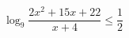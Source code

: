 \begin{ex}
	\begin{condition}
	\( \log_9\dfrac{2x^2+15x+22}{x+4}\leq\dfrac{1}{2} \)
	\end{condition}
	\answer{\( (-5,5;-5]\cup(-2;-1] \)}
\end{ex}